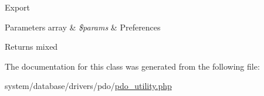 Export


\begin{DoxyParams}[1]{Parameters}
array & {\em \$params} & Preferences \\
\hline
\end{DoxyParams}
\begin{DoxyReturn}{Returns}
mixed 
\end{DoxyReturn}


The documentation for this class was generated from the following file\+:\begin{DoxyCompactItemize}
\item 
system/database/drivers/pdo/\mbox{\hyperlink{pdo__utility_8php}{pdo\+\_\+utility.\+php}}\end{DoxyCompactItemize}
